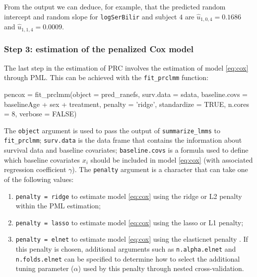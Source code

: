From the output we can deduce, for example, that the predicted random
intercept and random slope for \texttt{logSerBilir} and subject \(4\)
are \(\hat{u}_{1,0,4} = 0.1686\) and \(\hat{u}_{1,1,4} = 0.0009\).

\subsubsection{Step 3: estimation of the penalized Cox
model}\label{step-3-estimation-of-the-penalized-cox-model}

The last step in the estimation of PRC involves the estimation of model
\eqref{eq:cox} through PML. This can be achieved with the
\texttt{fit\_prclmm} function:

\begin{Schunk}
\begin{Sinput}
pencox = fit_prclmm(object = pred_ranefs, surv.data = sdata,
                    baseline.covs = ~ baselineAge + sex + treatment, penalty = 'ridge', 
                    standardize = TRUE, n.cores = 8, verbose = FALSE)
\end{Sinput}
\end{Schunk}

The \texttt{object} argument is used to pass the output of
\texttt{summarize\_lmms} to \texttt{fit\_prclmm}; \texttt{surv.data} is
the data frame that contains the information about survival data and
baseline covariates; \texttt{baseline.covs} is a formula used to define
which baseline covariates \(x_i\) should be included in model
\eqref{eq:cox} (with associated regression coefficient \(\gamma\)). The
\texttt{penalty} argument is a character that can take one of the
following values:

\begin{enumerate}
\def\labelenumi{\arabic{enumi}.}
\tightlist
\item
  \texttt{penalty\ =\ \textquotesingle{}ridge\textquotesingle{}} to
  estimate model \eqref{eq:cox} using the ridge or L2 penalty within the
  PML estimation;
\item
  \texttt{penalty\ =\ \textquotesingle{}lasso\textquotesingle{}} to
  estimate model \eqref{eq:cox} using the lasso or L1 penalty;
\item
  \texttt{penalty\ =\ \textquotesingle{}elnet\textquotesingle{}} to
  estimate model \eqref{eq:cox} using the elasticnet penalty
  \citep{zou2005}. If this penalty is chosen, additional arguments such
  as \texttt{n.alpha.elnet} and \texttt{n.folds.elnet} can be specified
  to determine how to select the additional tuning parameter
  (\(\alpha\)) used by this penalty through nested cross-validation.
\end{enumerate}

